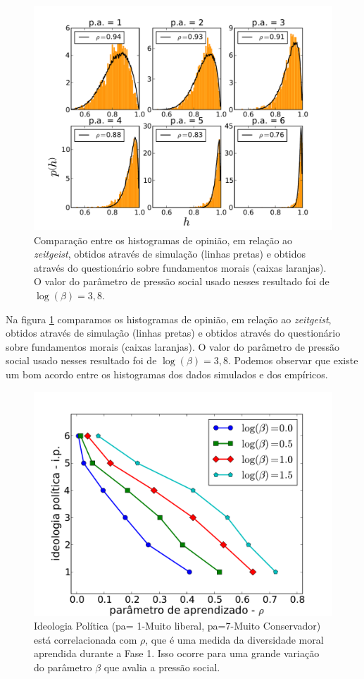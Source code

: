 \begin{figure}
    \centering
    \includegraphics[scale=0.5]{Figures/hists_b38}
    \caption{
        Comparação entre os histogramas de opinião, em relação ao
        \textit{zeitgeist}, obtidos através de simulação (linhas pretas)
        e obtidos através do questionário sobre fundamentos morais (caixas
        laranjas). O valor do parâmetro de pressão social usado nesses
        resultado foi de $\log(\beta)=3,8$.
    }
    \label{fig:hist}
\end{figure}

Na figura \ref{fig:hist}  comparamos os histogramas de opinião, em relação ao
\textit{zeitgeist}, obtidos através de simulação (linhas pretas) e
obtidos através do questionário sobre fundamentos morais (caixas
laranjas). O valor do parâmetro de pressão social usado nesses resultado foi de
$\log(\beta)=3,8$. Podemos observar que existe um bom acordo entre os
histogramas dos dados simulados e dos empíricos. 

\begin{figure}
\centering
\includegraphics[scale=0.6]{Figures/pa-rho.pdf}
\caption{ Ideologia Política (pa= 1-Muito liberal, pa=7-Muito Conservador)
está correlacionada com  $\rho$, que é uma medida da diversidade moral
aprendida durante a Fase 1. Isso ocorre para uma grande variação do parâmetro
$\beta$ que avalia a pressão social.}
\label{fig:pa-rho}
\end{figure}

